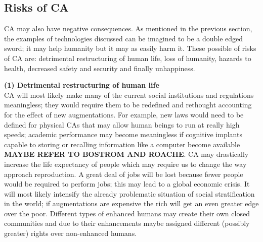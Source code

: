 \subsection{Risks of CA}


CA may also have negative consequences. As mentioned in the previous section, the examples of technologies discussed can be imagined to be a double edged sword; it may help humanity but it may as easily harm it. These possible of risks of CA are: detrimental restructuring of human life, loss of humanity, hazards to health, decreased safety and security and finally unhappiness.

\textbf{(1) Detrimental restructuring of human life} \\
CA will most likely make many of the current social institutions and regulations meaningless; they would require them to be redefined and rethought accounting for the effect of new augmentations. For example, new laws would need to be defined for physical CAs that may allow human beings to run at really high speeds; academic performance may become meaningless if cognitive implants capable to storing or recalling information like a computer become available {\bf MAYBE REFER TO BOSTROM AND ROACHE}. CA may drastically increase the life expectancy of people which may require us to change the way approach reproduction. A great deal of jobs will be lost because fewer people would be required to perform jobs; this may lead to a global economic crisis. It will most likely intensify the already problematic situation of social stratification in the world; if augmentations are expensive the rich will get an even greater edge over the poor. Different types of enhanced humans may create their own closed communities and due to their enhancements maybe assigned different (possibly greater) rights over non-enhanced humans.


